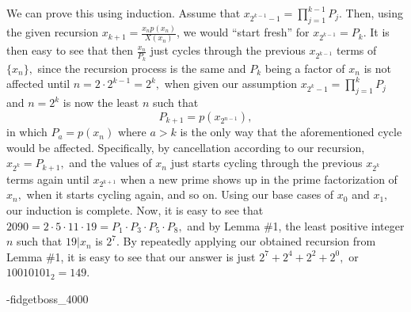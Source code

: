 \begin{enumerate}
 We can prove this using induction. Assume that $x_{2^{k-1}-1} = \prod_{j=1}^{k-1} P_j.$ Then, using the given recursion $x_{k+1} = \frac{x_np(x_n)}{X(x_n)}$, we would “start fresh” for $x_{2^{k-1}} = P_k.$ It is then easy to see that then $\frac{x_n}{P_k}$ just cycles through the previous $x_{2^{k-1}}$ terms of $\{ x_n \},$ since the recursion process is the same and $P_k$ being a factor of $x_n$ is not affected until $n = 2 \cdot {2^{k-1}} = 2^k,$ when given our assumption $x_{2^k - 1} = \prod_{j=1}^{k} P_j$ and $n = 2^k$ is now the least $n$ such that 
 \[P_{k+1} = p(x_{2^{n-1}}),\] in which $P_a = p(x_n)$ where $a > k$ is the only way that the aforementioned cycle would be affected. Specifically, by cancellation according to our recursion, $x_{2^k} = P_{k+1},$ and the values of $x_n$ just starts cycling through the previous $x_{2^k}$ terms again until $x_{2^{k+1}}$ when a new prime shows up in the prime factorization of $x_n,$ when it starts cycling again, and so on. Using our base cases of $x_0$ and $x_1,$ our induction is complete. Now, it is easy to see that $2090 = 2 \cdot 5 \cdot 11 \cdot 19 = P_1 \cdot P_3 \cdot P_5 \cdot P_8,$ and by Lemma \#1, the least positive integer $n$ such that $19 | x_n$ is $2^7.$ By repeatedly applying our obtained recursion from Lemma \#1, it is easy to see that our answer is just $2^7 + 2^4 + 2^2 + 2^0,$ or $10010101_2 = \boxed{149}.$

 -fidgetboss\_4000

 


 


 


\end{enumerate}
